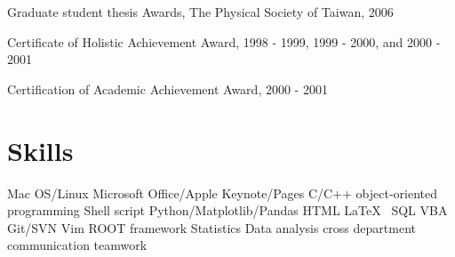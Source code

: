 \documentclass[letterpaper]{deedy-resume-openfont}
\begin{document}
\begin{tightemize}
\item \href{https://hdl.handle.net/11244/299774}{\color{link}{Dissertation link}}
\end{tightemize}
\sectionsep

\begin{tightemize}
\item \href{http://www.airitilibrary.com/Publication/alDetailedMesh1?DocID=U0001-1407200616551200}{\color{link}{Thesis link}}
\item Graduate student thesis Awards, The Physical Society of Taiwan, 2006
\end{tightemize}
\sectionsep

\begin{tightemize}
\item Certificate of Holistic Achievement Award, 1998 - 1999, 1999 - 2000, and 2000 - 2001
\item Certification of Academic Achievement Award, 2000 - 2001
\end{tightemize}
\sectionsep


\section{Skills}
Mac OS/Linux \textbullet{} Microsoft Office/Apple Keynote/Pages \textbullet{} C/C++ \textbullet{} object-oriented programming \textbullet{} Shell script \textbullet{} Python/Matplotlib/Pandas \textbullet{} HTML \textbullet{} \LaTeX\ \textbullet{} SQL \textbullet{} VBA \textbullet{} Git/SVN \textbullet{} Vim \textbullet{} ROOT framework \textbullet{} Statistics \textbullet{} Data analysis \textbullet{} cross department communication \textbullet{} teamwork\\
\sectionsep
\end{document}
